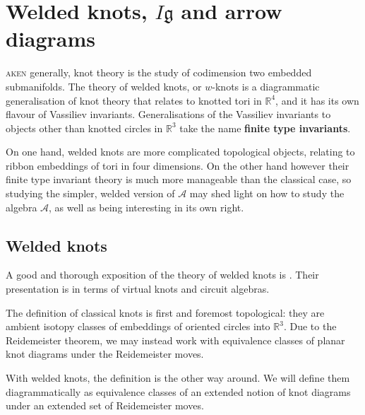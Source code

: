 \chapter{Welded knots, \(I\mathfrak{g}\) and arrow diagrams}
\label{ch:welded-knots-isometry-lie-algebras-and-arrow-diagrams}

\lettrine{}{aken} generally, knot theory is the study of codimension two embedded submanifolds. The theory of welded knots, or \(w\)-knots is a diagrammatic generalisation of knot theory that relates to knotted tori in \(\mathbb{R}^{4}\), and it has its own flavour of Vassiliev invariants. Generalisations of the Vassiliev invariants to objects other than knotted circles in \(\mathbb{R}^{3}\) take the name \textbf{finite type invariants}.

On one hand, welded knots are more complicated topological objects, relating to ribbon embeddings of tori in four dimensions. On the other hand however their finite type invariant theory is much more manageable than the classical case, so studying the simpler, welded version of \(\mathcal{A}\) may shed light on how to study the algebra \(\mathcal{A}\), as well as being interesting in its own right.

\section{Welded knots}

A good and thorough exposition of the theory of welded knots is \cite{finite-type-invariants-of-w-knotted-objects-I-w-knots-and-the-alexander-polynomial, finite-type-invariants-of-w-knotted-objects-II-tangles-foams-and-the-kashiwara-vergne-problem}. Their presentation is in terms of virtual knots and circuit algebras.

The definition of classical knots is first and foremost topological: they are ambient isotopy classes of embeddings of oriented circles into \(\mathbb{R}^{3}\). Due to the Reidemeister theorem, we may instead work with equivalence classes of planar knot diagrams under the Reidemeister moves.

With welded knots, the definition is the other way around. We will define them diagrammatically as equivalence classes of an extended notion of knot diagrams under an extended set of Reidemeister moves.

